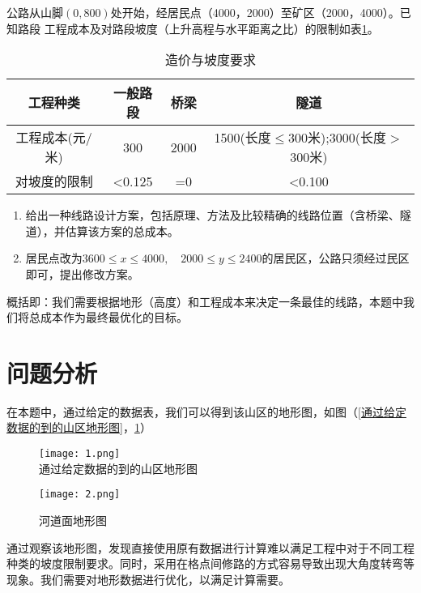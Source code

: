 \documentclass[bwprint]{cumcmthesis}
\begin{document}
	公路从山脚$(0,800)$处开始，经居民点（4000，2000）至矿区（2000，4000）。已知路段
工程成本及对路段坡度（上升高程与水平距离之比）的限制如表\ref{造价与坡度要求}。
	
\begin{table}[h]
\centering
\caption{造价与坡度要求}
\label{造价与坡度要求}
\begin{tabular}{cccc}
\toprule
工程种类&一般路段&桥梁&隧道\\
\midrule
工程成本(元/米) &300 &2000 & 1500(长度$\leqslant$300米);3000(长度$>$300米)\\
\midrule
对坡度的限制 & <0.125 & =0 & <0.100\\
\bottomrule
\end{tabular}
\end{table}

\begin{enumerate}
	\item 给出一种线路设计方案，包括原理、方法及比较精确的线路位置（含桥梁、隧道），并估算该方案的总成本。
	\item 居民点改为$3600 \leqslant x \leqslant 4000, \quad 2000 \leqslant y \leqslant 2400$的居民区，公路只须经过民区即可，提出修改方案。
\end{enumerate}

概括即：我们需要根据地形（高度）和工程成本来决定一条最佳的线路，本题中我们将总成本作为最终最优化的目标。
	
\section{问题分析}	
在本题中，通过给定的数据表，我们可以得到该山区的地形图，如图（\ref{通过给定数据的到的山区地形图}，\ref{河道面地形图}）

\begin{figure}[h]  
\begin{minipage}[t]{0.5\textwidth}
\centering  
\texttt{[image: 1.png]} \\
\caption{通过给定数据的到的山区地形图} \label{通过给定数据的到的山区地形图}
\end{minipage}
\hspace{1ex}
\begin{minipage}[t]{0.5\textwidth}  
\centering  
\texttt{[image: 2.png]}\\
\caption{河道面地形图}  \label{河道面地形图}
\end{minipage}  
\end{figure} 

通过观察该地形图，发现直接使用原有数据进行计算难以满足工程中对于不同工程种类的坡度限制要求。同时，采用在格点间修路的方式容易导致出现大角度转弯等现象。我们需要对地形数据进行优化，以满足计算需要。
\end{document}

